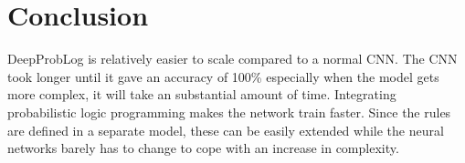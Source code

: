 \section{Conclusion}
DeepProbLog is relatively easier to scale compared to a normal CNN. The CNN took longer until it gave an accuracy of 100\% especially when the model gets more complex, it will take an substantial amount of time. Integrating probabilistic logic programming makes the network train faster. Since the rules are defined in a separate model, these can be easily extended while the neural networks barely has to change to cope with an increase in complexity.
